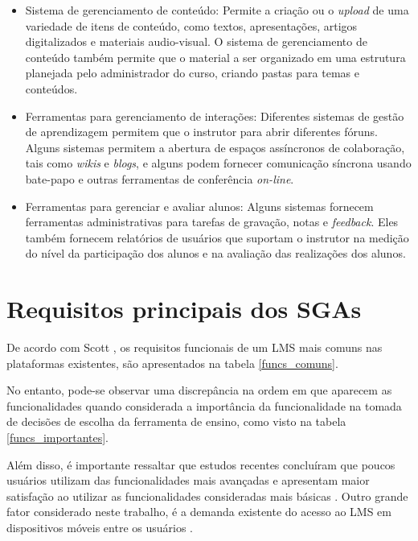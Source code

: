\begin{itemize}
    \item Sistema de gerenciamento de conteúdo: Permite  a criação ou o \textit{upload} de uma variedade de itens de conteúdo, como textos, apresentações, artigos digitalizados e materiais audio-visual. O sistema de gerenciamento de conteúdo também permite que o material a ser organizado em uma estrutura planejada pelo administrador do curso, criando pastas para temas e conteúdos.
    \item Ferramentas para gerenciamento de interações: Diferentes sistemas de gestão de aprendizagem permitem que o instrutor para abrir diferentes fóruns. Alguns sistemas permitem a abertura de espaços assíncronos de colaboração, tais como \textit{wikis} e \textit{blogs}, e alguns podem fornecer comunicação síncrona usando bate-papo e outras ferramentas de conferência \textit{on-line}.
    \item Ferramentas para gerenciar e avaliar alunos: Alguns sistemas fornecem ferramentas administrativas para tarefas de gravação, notas e \textit{feedback}. Eles também fornecem relatórios de usuários que suportam o instrutor na medição do nível da participação dos alunos e na avaliação das realizações dos alunos.
\end{itemize}


\section{Requisitos principais dos SGAs}

De acordo com Scott \cite{article:scott}, os requisitos funcionais de um LMS mais comuns nas plataformas existentes, são apresentados na tabela \ref{funcs_comuns}.

No entanto, pode-se observar uma discrepância na ordem em que aparecem as funcionalidades quando considerada a importância da funcionalidade na tomada de decisões de escolha da ferramenta de ensino, como visto na tabela \ref{funcs_importantes}.

Além disso, é importante ressaltar que estudos recentes concluíram que poucos usuários utilizam das funcionalidades mais avançadas e apresentam maior satisfação ao utilizar as funcionalidades consideradas mais básicas \cite{report:educause}.
Outro grande fator considerado neste trabalho, é a demanda existente do acesso ao LMS em dispositivos móveis entre os usuários \cite{report:educause}.

